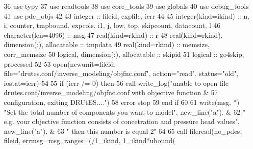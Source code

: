 \begin{DoxyCode}
36       \textcolor{keywordtype}{use }typy
37       \textcolor{keywordtype}{use }readtools
38       \textcolor{keywordtype}{use }core_tools
39       \textcolor{keywordtype}{use }globals
40       \textcolor{keywordtype}{use }debug_tools
41       \textcolor{keywordtype}{use }pde_objs
42       
43       \textcolor{keywordtype}{integer} :: fileid, expfile, ierr
44       
45       \textcolor{keywordtype}{integer(kind=ikind)} :: n, i, counter, tmpbound, expcols, i1, j, low\textcolor{comment}{, top, skipcount, datacount, l}
46 \textcolor{comment}{      }\textcolor{keywordtype}{character(len=4096)} :: msg
47       \textcolor{keywordtype}{real(kind=rkind)} :: r
48       \textcolor{keywordtype}{real(kind=rkind)}, \textcolor{keywordtype}{dimension(:)}, \textcolor{keywordtype}{allocatable} :: tmpdata
49       \textcolor{keywordtype}{real(kind=rkind)} :: memsize, corr\_memsize
50       \textcolor{keywordtype}{logical}, \textcolor{keywordtype}{dimension(:)}, \textcolor{keywordtype}{allocatable} :: skipid
51       \textcolor{keywordtype}{logical} :: go4skip, processed
52       
53       \textcolor{keyword}{open}(newunit=fileid, file=\textcolor{stringliteral}{"drutes.conf/inverse\_modeling/objfnc.conf"}\textcolor{comment}{, action=}\textcolor{stringliteral}{"read"}\textcolor{comment}{, status=}\textcolor{stringliteral}{"old"}\textcolor{comment}{, 
      iostat=ierr)}
54 \textcolor{comment}{      }
55 \textcolor{comment}{      }\textcolor{keywordflow}{if} (ierr /= 0) \textcolor{keywordflow}{then}
56         \textcolor{keyword}{call }write_log(\textcolor{stringliteral}{"unable to open file drutes.conf/inverse\_modeling/objfnc.conf with objective
       function &}
57 \textcolor{stringliteral}{}\textcolor{stringliteral}{        configuration, exiting DRUtES...."})
58         error stop
59 \textcolor{keywordflow}{      end if}
60       
61       \textcolor{keyword}{write}(msg, *) \textcolor{stringliteral}{"Set the total number of components you want to model"}\textcolor{comment}{, new\_line(}\textcolor{stringliteral}{"a"}\textcolor{comment}{), &}
62 \textcolor{comment}{                    }\textcolor{stringliteral}{"    e.g. your objective function consists of concetration and pressure head values"}\textcolor{comment}{,  
      new\_line(}\textcolor{stringliteral}{"a"}\textcolor{comment}{), &}
63 \textcolor{comment}{                    }\textcolor{stringliteral}{"    then this number is equal 2"}
64                     
65       \textcolor{keyword}{call }fileread(no\_pdes, fileid, errmsg=msg, ranges=(/1\_ikind, 1\_ikind\textcolor{comment}{*ubound(
}
\end{DoxyCode}
